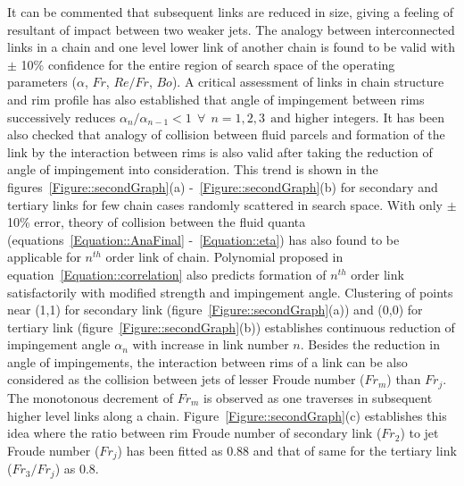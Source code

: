 It can be commented that subsequent links are reduced in size, giving a feeling of resultant of impact between two weaker jets. The analogy between interconnected links in a chain and one level lower link of another chain is found to be valid with $\pm$ 10\% confidence for the entire region of search space of the operating parameters ($\alpha$, $Fr$, $Re/Fr$, $Bo$). A critical assessment of links in chain structure and rim profile has also established that angle of impingement between rims successively reduces $\alpha_{n}/\alpha_{n-1} < 1 \:\:\forall\:\: n = 1, 2, 3 \:\:\text{and higher integers}$. It has been also checked that analogy of collision between fluid parcels and formation of the link by the interaction between rims is also valid after taking the reduction of angle of impingement into consideration. This trend is shown in the figures~\ref{Figure::secondGraph}(a) -~\ref{Figure::secondGraph}(b) for secondary and tertiary links for few chain cases randomly scattered in search space. With only $\pm$ 10\% error, theory of collision between the fluid quanta (equations~\ref{Equation::AnaFinal} -~\ref{Equation::eta}) has also found to be applicable for $n^{th}$ order link of chain. Polynomial proposed in equation~\ref{Equation::correlation} also predicts formation of $n^{th}$ order link satisfactorily with modified strength and impingement angle. Clustering of points near (1,1) for secondary link (figure~\ref{Figure::secondGraph}(a)) and (0,0) for tertiary link (figure~\ref{Figure::secondGraph}(b)) establishes continuous reduction of impingement angle $\alpha_{n}$ with increase in link number $n$. Besides the reduction in angle of impingements, the interaction between rims of a link can be also considered as the collision between jets of lesser Froude number ($Fr_m$) than $Fr_j$. The monotonous decrement of $Fr_m$ is observed as one traverses in subsequent higher level links along a chain. Figure~\ref{Figure::secondGraph}(c) establishes this idea where the ratio between rim Froude number of secondary link ($Fr_2$) to jet Froude number ($Fr_j$) has been fitted as 0.88 and that of same for the tertiary link ($Fr_3/Fr_j$) as 0.8.\\
